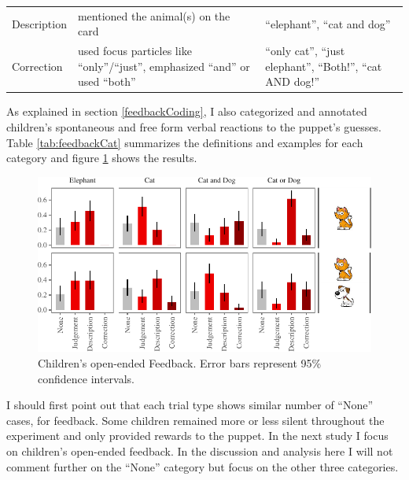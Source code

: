 \documentclass[oneside]{report}
\theoremstyle{definition}
\theoremstyle{definition}
\theoremstyle{definition}
\theoremstyle{remark}
\begin{document}
\begin{longtable}[]{@{}lll@{}}
\begin{minipage}[t]{0.11\columnwidth}\raggedright\strut
Description\strut
\end{minipage} & \begin{minipage}[t]{0.46\columnwidth}\raggedright\strut
mentioned the animal(s) on the card\strut
\end{minipage} & \begin{minipage}[t]{0.32\columnwidth}\raggedright\strut
``elephant'', ``cat and dog''\strut
\end{minipage}\tabularnewline
\begin{minipage}[t]{0.11\columnwidth}\raggedright\strut
Correction\strut
\end{minipage} & \begin{minipage}[t]{0.46\columnwidth}\raggedright\strut
used focus particles like ``only''/``just'', emphasized ``and'' or used
``both''\strut
\end{minipage} & \begin{minipage}[t]{0.32\columnwidth}\raggedright\strut
``only cat'', ``just elephant'', ``Both!'', ``cat AND dog!''\strut
\end{minipage}\tabularnewline
\bottomrule
\end{longtable}
As explained in section \ref{feedbackCoding}, I also categorized and
annotated children's spontaneous and free form verbal reactions to the
puppet's guesses. Table \ref{tab:feedbackCat} summarizes the definitions
and examples for each category and figure \ref{fig:feedbackData} shows
the results.
\begin{figure}[h]

{\centering \includegraphics{figs/feedbackData-1} 

}

\caption{Children's open-ended Feedback. Error bars represent 95\% confidence intervals.}\label{fig:feedbackData}
\end{figure}
I should first point out that each trial type shows similar number of
``None'' cases, for feedback. Some children remained more or less silent
throughout the experiment and only provided rewards to the puppet. In
the next study I focus on children's open-ended feedback. In the
discussion and analysis here I will not comment further on the ``None''
category but focus on the other three categories.
\end{document}
